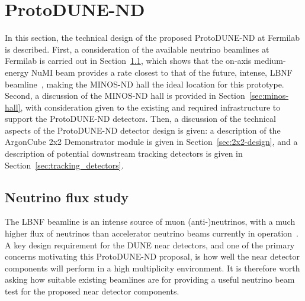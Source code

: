 \section{ProtoDUNE-ND}
\label{sec:protodune-nd}
In this section, the technical design of the proposed ProtoDUNE-ND at Fermilab is described. First, a consideration of the available neutrino beamlines at Fermilab is carried out in Section~\ref{sec:neutrino-flux}, which shows that the on-axis medium-energy NuMI beam provides a rate closest to that of the future, intense, LBNF beamline~\cite{DUNE3, dune_opt_flux}, making the MINOS-ND hall the ideal location for this prototype. Second, a discussion of the MINOS-ND hall is provided in Section~\ref{sec:minos-hall}, with consideration given to the existing and required infrastructure to support the ProtoDUNE-ND detectors. Then, a discussion of the technical aspects of the ProtoDUNE-ND detector design is given: a description of the ArgonCube 2x2 Demonstrator module is given in Section~\ref{sec:2x2-design}, and a description of potential downstream tracking detectors is given in Section~\ref{sec:tracking_detectors}. %

\subsection{Neutrino flux study}
\label{sec:neutrino-flux}
The LBNF beamline is an intense source of muon (anti-)neutrinos, with a much higher flux of neutrinos than accelerator neutrino beams currently in operation~\cite{DUNE3,dune_opt_flux}. A key design requirement for the DUNE near detectors, and one of the primary concerns motivating this ProtoDUNE-ND proposal, is how well the near detector components will perform in a high multiplicity environment. It is therefore worth asking how suitable existing beamlines are for providing a useful neutrino beam test for the proposed near detector components.

